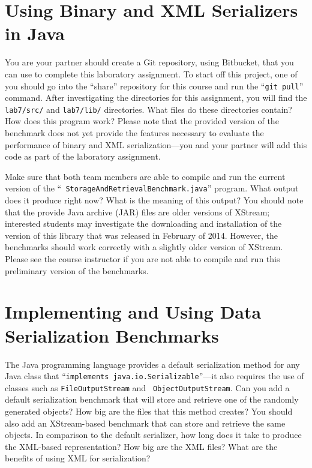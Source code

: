 \vspace*{-.05in}
\section*{Using Binary and XML Serializers in Java}

You are your partner should create a Git repository, using Bitbucket, that you can use to complete this laboratory
assignment.  To start off this project, one of you should go into the ``share'' repository for this course and run the
``{\tt git pull}'' command. After investigating the directories for this assignment, you will find the {\tt lab7/src/}
and {\tt lab7/lib/} directories. What files do these directories contain? How does this program work? Please note that
the provided version of the benchmark does not yet provide the features necessary to evaluate the performance of binary
and XML serialization---you and your partner will add this code as part of the laboratory assignment.

Make sure that both team members are able to compile and run the current version of the ``{\tt
  StorageAndRetrievalBenchmark.java}'' program. What output does it produce right now? What is the meaning of this
output? You should note that the provide Java archive (JAR) files are older versions of XStream; interested students may
investigate the downloading and installation of the version of this library that was released in February of 2014.
However, the benchmarks should work correctly with a slightly older version of XStream. Please see the course instructor
if you are not able to compile and run this preliminary version of the benchmarks.

\vspace*{-.05in}
\section*{Implementing and Using Data Serialization Benchmarks}

The Java programming language provides a default serialization method for any Java class that ``{\tt implements
  java.io.Serializable}''---it also requires the use of classes such as {\tt FileOutputStream} and {\tt
  ObjectOutputStream}. Can you add a default serialization benchmark that will store and retrieve one of the randomly
generated objects? How big are the files that this method creates?  You should also add an XStream-based benchmark that
can store and retrieve the same objects. In comparison to the default serializer, how long does it take to produce the
XML-based representation? How big are the XML files? What are the benefits of using XML for serialization?

